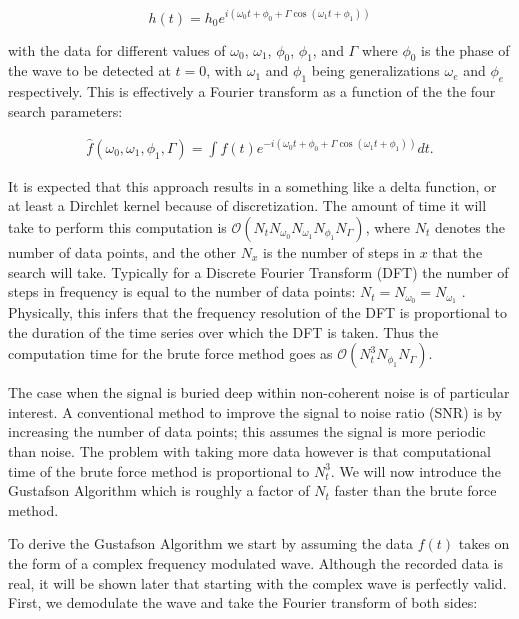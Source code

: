 \documentclass[onecolumn, groupedaddress, 10pt]{revtex4-1}
\begin{document}
\begin{equation}
h(t) = h_0 e^{i\left( \omega_0 t + \phi_0 + \Gamma \cos (\omega_1 t + \phi_1 ) \right)}
\end{equation}

with the data for different values of $\omega_0$, $\omega_1$, $\phi_0$, $\phi_1$, and $\Gamma$ where $\phi_0$ is the phase of the wave to be detected at $t=0$, with $\omega_1$ and $\phi_1$ being generalizations $\omega_e$ and $\phi_e$ respectively.  This is effectively a Fourier transform as a function of the the four search parameters:

\begin{align}
\hat{f}(\omega_0, \omega_1, \phi_1, \Gamma) = \int f(t) e^{-i\left( \omega_0 t + \phi_0 + \Gamma \cos (\omega_1 t + \phi_1 ) \right)} dt.
\end{align}

It is expected that this approach results in a something like a delta function, or at least a Dirchlet kernel because of discretization.  The amount of time it will take to perform this computation is $\mathcal{O} (N_tN_{\omega_0}N_{\omega_1}N_{\phi_1}N_\Gamma)$, where $N_t$ denotes the number of data points, and the other $N_x$ is the number of steps in $x$ that the search will take.  Typically for a Discrete Fourier Transform (DFT) the number of steps in frequency is equal to the number of data points: $N_t=N_{\omega_0}=N_{\omega_1}$ \cite{rader1968discrete}.  Physically, this infers that the frequency resolution of the DFT is proportional to the duration of the time series over which the DFT is taken.  Thus the computation time for the brute force method goes as $\mathcal{O} (N_t^3N_{\phi_1}N_\Gamma)$.  

The case when the signal is buried deep within non-coherent noise is of particular interest.  A conventional method to improve the signal to noise ratio (SNR) is by increasing the number of data points;  this assumes the signal is more periodic than noise. The problem with taking more data however is that computational time of the brute force method is proportional to $N_t^3$.  We will now introduce the Gustafson Algorithm which is roughly a factor of $N_t$ faster than the brute force method.

To derive the Gustafson Algorithm we start by assuming the data $f(t)$ takes on the form of a complex frequency modulated wave. Although the recorded data is real, it will be shown later that starting with the complex wave is perfectly valid.  First, we demodulate the wave and take the Fourier transform of both sides:
\end{document}
